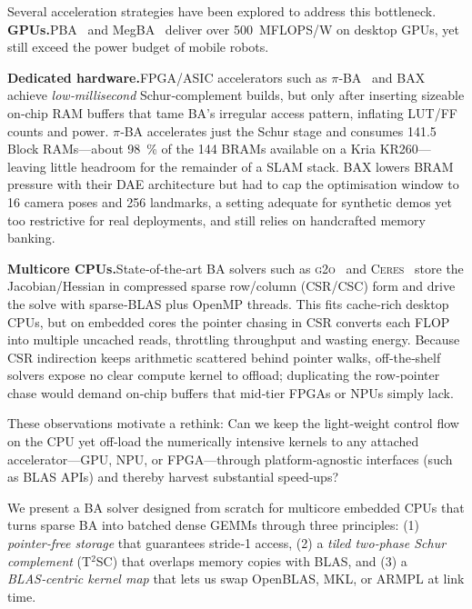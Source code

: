 Several acceleration strategies have been explored to address this bottleneck. 
\textbf{GPUs.}\;PBA~\cite{wu2011multicore} and MegBA~\cite{ren2022megba} deliver over 500~MFLOPS/W on desktop GPUs, 
yet still exceed the power budget of mobile robots.

\textbf{Dedicated hardware.}\;FPGA/ASIC accelerators such as $\pi$‑BA~\cite{qin2019pi} and BAX~\cite{sun2020bax} 
achieve \emph{low‑millisecond} Schur‑complement builds, but only after inserting sizeable on‑chip RAM buffers that 
tame BA's irregular access pattern, inflating LUT/FF counts and power. $\pi$‑BA accelerates just the Schur stage and 
consumes 141.5 Block RAMs—about 98~\% of the 144 BRAMs available on a Kria KR260—leaving little headroom for the 
remainder of a SLAM stack. BAX lowers BRAM pressure with their DAE architecture but had to cap the optimisation window 
to 16 camera poses and 256 landmarks, a setting adequate for synthetic demos yet too restrictive for real deployments, 
and still relies on handcrafted memory banking.

\textbf{Multicore CPUs.}\;State‑of‑the‑art BA solvers such as \textsc{g2o}~\cite{kummerle2011g} and 
\textsc{Ceres}~\cite{agarwal2012ceres} store the Jacobian/Hessian in compressed sparse row/column (CSR/CSC) form and 
drive the solve with sparse‑BLAS plus OpenMP threads. This fits cache‑rich desktop CPUs, but on embedded cores the 
pointer chasing in CSR converts each FLOP into multiple uncached reads, throttling throughput and wasting energy. 
Because CSR indirection keeps arithmetic scattered behind pointer walks, off‑the‑shelf solvers expose no clear compute 
kernel to offload; duplicating the row‑pointer chase would demand on‑chip buffers that mid‑tier FPGAs or NPUs simply lack.

These observations motivate a rethink: Can we keep the light‑weight control flow on the CPU yet off‑load the numerically 
intensive kernels to any attached accelerator—GPU, NPU, or FPGA—through platform‑agnostic interfaces (such as BLAS\cite{BLAS} APIs) and thereby harvest 
substantial speed‑ups?

We present a BA solver designed from scratch for multicore embedded CPUs that turns sparse BA into 
batched dense GEMMs through three principles: (1) \emph{pointer‑free storage} that guarantees stride‑1 access, (2) a 
\emph{tiled two‑phase Schur complement} (T$^{2}$SC) that overlaps memory copies with BLAS, and (3) a 
\emph{BLAS‑centric kernel map} that lets us swap OpenBLAS, MKL, or ARMPL at link time.

